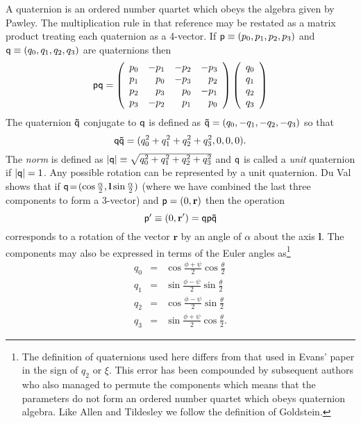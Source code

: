 \documentclass[a4paper,twoside]{report}
\providecommand{\bm}[1]{\mathbf{#1}}
\begin{document}
A quaternion  is an ordered number  quartet  which obeys  the  algebra
given  by   Pawley\cite{pawley:81}.  The multiplication   rule in that
reference may be restated as a matrix product treating each quaternion
as a  4-vector.  If  $\Quat{p} \equiv (p_0,p_1,p_2,p_3)$ and  $\Quat{q}
\equiv  (q_0,q_1,q_2,q_3)$  are quaternions then
\begin{equation}
\Quat{pq} = 
\left(
\begin{array}{rrrr}
p_0 & -p_1 & -p_2 & -p_3 \\
p_1 &  p_0 & -p_3 &  p_2 \\
p_2 &  p_3 &  p_0 & -p_1 \\
p_3 & -p_2 &  p_1 &  p_0 
\end{array}
\right) \left(
\begin{array}{r}
q_0 \\ q_1 \\ q_2 \\ q_3
\end{array}
\right)
\end{equation}
The quaternion $ \Quat{\tilde{q}} $ conjugate to $\Quat{q}$ is defined
as $\Quat{\tilde{q}} = (q_0,-q_1,-q_2,-q_3)$ so that
\begin{equation}
\Quat{q\tilde{q}} = (q_0^2+q_1^2+q_2^2+q_3^2,0,0,0).
\label{eqn:qnorm}
\end{equation}
The \emph{norm} is defined as $ |\Quat{q}| \equiv
\sqrt{q_0^2+q_1^2+q_2^2+q_3^2} $ and $\Quat{q}$ is called a
\emph{unit} quaternion if $ |\Quat{q}| = 1 $.  Any possible rotation
can be represented by a unit quaternion. Du Val shows\cite{duval:64}
that if $ \Quat{q} \! = \! (\cos \frac{\alpha}{2}, \bm{l} \sin
\frac{\alpha}{2}) $ (where we have combined the last three components
to form a 3-vector) and $\Quat{p} = (0,\bm{r})$ then the operation
\begin{equation}
\Quat{p'} \equiv (0,\bm{r'}) = \Quat{q p \tilde{q}}
\end{equation}
corresponds to a rotation of the vector $\bm{r}$ by an angle of
$\alpha$ about the axis $\bm{l}$.  The components may also be
expressed in terms of the Euler angles as\footnote{The definition of
  quaternions used here differs from that used in Evans'
  paper\cite[equation 21]{evans:77} in the sign of $q_2$ or $\xi$.
  This error has been compounded by subsequent
  authors\cite{sonnenschein:85,smith:82,laakonsen:85} who also managed
  to permute the components which means that the parameters do not
  form an ordered number quartet which obeys quaternion algebra. Like
  Allen and Tildesley\cite[page 88]{allen:87} we follow the definition
  of Goldstein\cite[pages 143 and 155]{goldstein:80}.}
\begin{eqnarray}
q_0 & = & \cos \frac{\phi+\psi}{2} \cos \frac{\theta}{2} \nonumber \\
q_1 & = & \sin \frac{\phi-\psi}{2} \sin \frac{\theta}{2} \nonumber \\
q_2 & = & \cos \frac{\phi-\psi}{2} \sin \frac{\theta}{2} \nonumber \\
q_3 & = & \sin \frac{\phi+\psi}{2} \cos \frac{\theta}{2}.
\label{eqn:qeuler}
\end{eqnarray}
\end{document}
